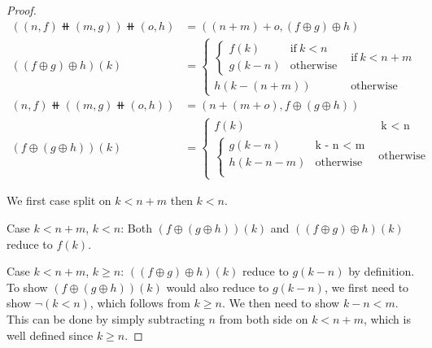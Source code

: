 \begin{proof}
    \begin{align*}
        ((n, f) \doubleplus (m, g)) \doubleplus (o, h) & = ((n + m) + o, (f \oplus g) \oplus h)                \\
        ((f \oplus g) \oplus h)(k)                     & = \begin{cases}
                                                               \begin{cases}
                f(k)     & \text{if}\ k < n \\
                g(k - n) & \text{otherwise}
            \end{cases}
                                                                              & \text{if}\ k < n + m \\
                                                               h(k - (n + m)) & \text{otherwise}
                                                           \end{cases}                    \\
        (n, f) \doubleplus ((m, g) \doubleplus (o, h)) & = (n + (m + o), f \oplus (g \oplus h))                \\
        (f \oplus (g \oplus h))(k)                     & = \begin{cases}
                                                               f(k)                               & \ \text{k < n} \\
                                                               \begin{cases}
                g(k - n)     & \text{k - n < m} \\
                h(k - n - m) & \text{otherwise} \\
            \end{cases} & \text{otherwise}
                                                           \end{cases}
    \end{align*}

    We first case split on $k < n + m$ then $k < n$.

    Case $k < n + m$, $k < n$: Both $(f \oplus (g \oplus h))(k)$ and $((f \oplus g) \oplus h)(k)$ reduce to $f(k)$.

    Case $k < n + m$, $k \geq n$: $((f \oplus g) \oplus h)(k)$ reduce to $g(k - n)$ by definition.
    To show $(f \oplus (g \oplus h))(k)$ would also reduce to $g(k - n)$, we first need to show $\neg(k < n)$,
    which follows from $k \geq n$. We then need to show $k - n < m$.
    This can be done by simply subtracting $n$ from both side on $k < n + m$, which is well defined since $k \geq n$.


\end{proof}
